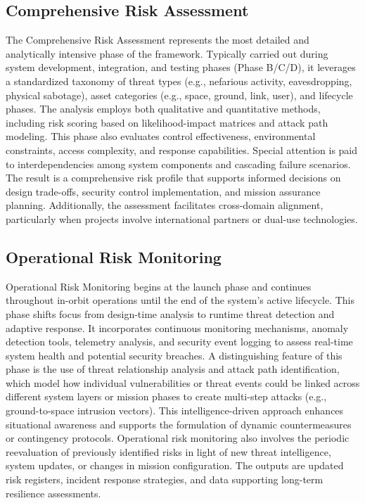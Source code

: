 \documentclass[binding=0.6cm]{sapthesis}
\begin{document}
\subsection{Comprehensive Risk Assessment}
The Comprehensive Risk Assessment represents the most detailed and analytically intensive phase of the framework. Typically carried out during system development, integration, and testing phases (Phase B/C/D), it leverages a standardized taxonomy of threat types (e.g., nefarious activity, eavesdropping, physical sabotage), asset categories (e.g., space, ground, link, user), and lifecycle phases. The analysis employs both qualitative and quantitative methods, including risk scoring based on likelihood-impact matrices and attack path modeling. This phase also evaluates control effectiveness, environmental constraints, access complexity, and response capabilities. Special attention is paid to interdependencies among system components and cascading failure scenarios. The result is a comprehensive risk profile that supports informed decisions on design trade-offs, security control implementation, and mission assurance planning. Additionally, the assessment facilitates cross-domain alignment, particularly when projects involve international partners or dual-use technologies.

\subsection{Operational Risk Monitoring}
Operational Risk Monitoring begins at the launch phase and continues throughout in-orbit operations until the end of the system's active lifecycle. This phase shifts focus from design-time analysis to runtime threat detection and adaptive response. It incorporates continuous monitoring mechanisms, anomaly detection tools, telemetry analysis, and security event logging to assess real-time system health and potential security breaches. A distinguishing feature of this phase is the use of threat relationship analysis and attack path identification, which model how individual vulnerabilities or threat events could be linked across different system layers or mission phases to create multi-step attacks (e.g., ground-to-space intrusion vectors). This intelligence-driven approach enhances situational awareness and supports the formulation of dynamic countermeasures or contingency protocols. Operational risk monitoring also involves the periodic reevaluation of previously identified risks in light of new threat intelligence, system updates, or changes in mission configuration. The outputs are updated risk registers, incident response strategies, and data supporting long-term resilience assessments.
\end{document}
